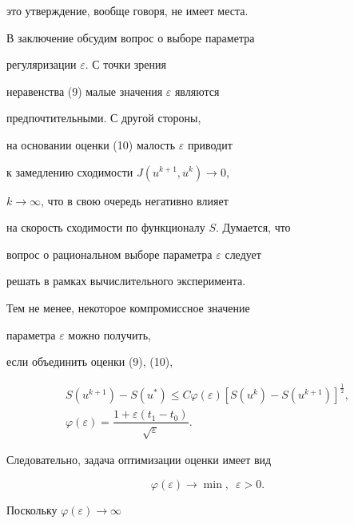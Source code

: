 это утверждение, вообще говоря, не имеет места. 





В заключение обсудим вопрос о выборе параметра 


регуляризации $\varepsilon$. С точки зрения


неравенства (9) малые значения $\varepsilon$ являются 


предпочтительными. С другой стороны,


на основании оценки (10) малость $\varepsilon$ приводит 


к замедлению сходимости $J(u^{k+1},u^{k})\rightarrow 0$,


$k\rightarrow \infty$, что в свою очередь негативно влияет


на скорость сходимости по функционалу $S$. Думается, что


вопрос о рациональном выборе параметра $\varepsilon$ следует 


решать в рамках вычислительного эксперимента.





Тем не менее, некоторое компромиссное значение 


параметра $\varepsilon$ можно получить, 


если объединить оценки (9), (10),


\begin{equation}


\begin{array}{c}


S(u^{k+1})-S(u^{*})\leq C\varphi(\varepsilon)


[S(u^{k})-S(u^{k+1})]^{\frac{1}{2}}, \\[3mm]


%


\varphi(\varepsilon)=\dfrac{1+\varepsilon(t_{1}-t_{0})}{\sqrt{\varepsilon}}.


\end{array}


\end{equation}


Следовательно, задача оптимизации оценки имеет вид


$$


\varphi(\varepsilon)\rightarrow \min,\ \;\varepsilon>0.


$$





Поскольку $\varphi(\varepsilon)\rightarrow \infty$ 


